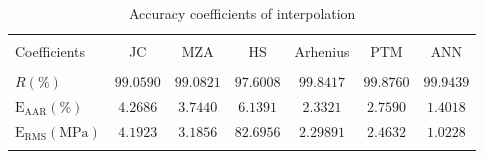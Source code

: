 \documentclass[twoside,english,1p,final,sort&compress]{elsarticle}
\theoremstyle{plain}
\newcommand{\RMSE}{\text{E}_\text{RMS}}
\newcommand{\AARE}{\text{E}_\text{AAR}}
\begin{document}
\begin{table}[h!]
\centering{}
\caption{Accuracy coefficients of interpolation}
\begin{tabular}{lcccccc}
\hline
&		&		&         &             &		   &	\\
Coefficients&JC  & MZA  &HS  & Arhenius      & PTM  &ANN \\
&				&				&         &             &	&\\
\hline
$R(\%)$&$99.0590$&$99.0821$&$97.6008$&$99.8417$& $99.8760$&$99.9439$  \\
$\AARE(\%)$&$4.2686$&$3.7440$&$6.1391$&$2.3321$&$2.7590$&$1.4018$   \\
$\RMSE(\text{MPa})$&$4.1923$&$3.1856$&$82.6956$&$2.29891$&$2.4632$&$1.0228$ \\
\hline
\label{tab:inValid}
\end{tabular}
\end{table}
\end{document}
